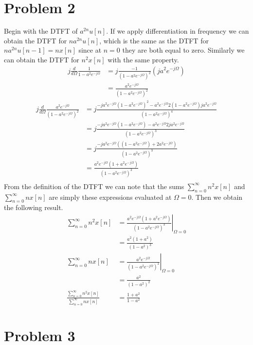 \documentclass[12pt]{article}
\begin{document}
\section*{Problem 2}

Begin with the DTFT of \(a^{2n}u[n]\). If we apply differentiation in frequency we can obtain the DTFT for \(na^{2n}u[n]\),
which is the same as the DTFT for \(na^{2n}u[n-1]=nx[n]\) since at \(n=0\) they are both equal to zero. Similarly we can
obtain the DTFT for \(n^2x[n]\) with the same property.
\begin{align*}
    j\frac{d}{d\Omega}\frac{1}{1-a^2e^{-j\Omega}}&=j\frac{-1}{(1-a^2e^{-j\Omega})^2}(ja^2e^{-j\Omega})\\
    &=\frac{a^2e^{-j\Omega}}{(1-a^2e^{-j\Omega})^2}
\end{align*}
\begin{align*}
    j\frac{d}{d\Omega}\frac{a^2e^{-j\Omega}}{(1-a^2e^{-j\Omega})^2}&=j\frac{-ja^2e^{-j\Omega}(1-a^2e^{-j\Omega})^2 - a^2e^{-j\Omega}2(1-a^2e^{-j\Omega})ja^2e^{-j\Omega}}{(1-a^2e^{-j\Omega})^4}\\
    &=j\frac{-ja^2e^{-j\Omega}(1-a^2e^{-j\Omega}) - a^2e^{-j\Omega}2ja^2e^{-j\Omega}}{(1-a^2e^{-j\Omega})^3}\\
    &=j\frac{-ja^2e^{-j\Omega}((1-a^2e^{-j\Omega}) + 2a^2e^{-j\Omega})}{(1-a^2e^{-j\Omega})^3}\\
    &=\frac{a^2e^{-j\Omega}(1+a^2e^{-j\Omega})}{(1-a^2e^{-j\Omega})^3}\\
\end{align*}
From the definition of the DTFT we can note that the sums \(\sum_{n=0}^\infty n^2x[n]\) and \(\sum_{n=0}^\infty nx[n]\)
are simply these expressions evaluated at \(\Omega=0\). Then we obtain the following result.
\begin{align*}
    \sum_{n=0}^\infty n^2x[n]&=\left.\frac{a^2e^{-j\Omega}(1+a^2e^{-j\Omega})}{(1-a^2e^{-j\Omega})^3}\right|_{\Omega=0}\\
    &=\frac{a^2(1+a^2)}{(1-a^2)^3}\\
    \sum_{n=0}^\infty nx[n]&=\left.\frac{a^2e^{-j\Omega}}{(1-a^2e^{-j\Omega})^2}\right|_{\Omega=0}\\
    &=\frac{a^2}{(1-a^2)^2}\\
    \frac{\sum_{n=0}^\infty n^2x[n]}{\sum_{n=0}^\infty nx[n]}&=\frac{1+a^2}{1-a^2}
\end{align*}

\section*{Problem 3}
\end{document}
